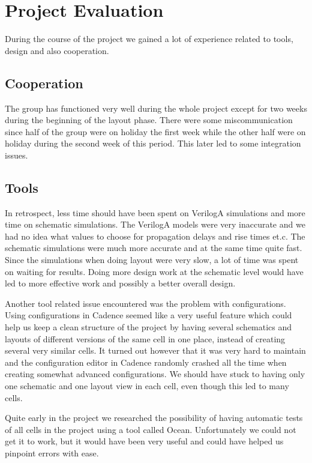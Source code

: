 \section{Project Evaluation} \label{sec:evaluation}
During the course of the project we gained a lot of experience related to tools, design and also cooperation. 

\subsection{Cooperation} \label{sec:eval_coop}
The group has functioned very well during the whole project except for two weeks during the beginning of the layout phase. There were some miscommunication since half of the group were on holiday the first week while the other half were on holiday during the second week of this period. This later led to some integration issues.

\subsection{Tools}
In retrospect, less time should have been spent on VerilogA simulations and more time on schematic simulations. The VerilogA models were very inaccurate and we had no idea what values to choose for propagation delays and rise times et.c. The schematic simulations were much more accurate and at the same time quite fast. Since the simulations when doing layout were very slow, a lot of time was spent on waiting for results. Doing more design work at the schematic level would have led to more effective work and possibly a better overall design.

Another tool related issue encountered was the problem with configurations. Using configurations in Cadence seemed like a very useful feature which could help us keep a clean structure of the project by having several schematics and layouts of different versions of the same cell in one place, instead of creating several very similar cells. It turned out however that it was very hard to maintain and the configuration editor in Cadence randomly crashed all the time when creating somewhat advanced configurations. We should have stuck to having only one schematic and one layout view in each cell, even though this led to many cells.

Quite early in the project we researched the possibility of having automatic tests of all cells in the project using a tool called Ocean. Unfortunately we could not get it to work, but it would have been very useful and could have helped us pinpoint errors with ease.


